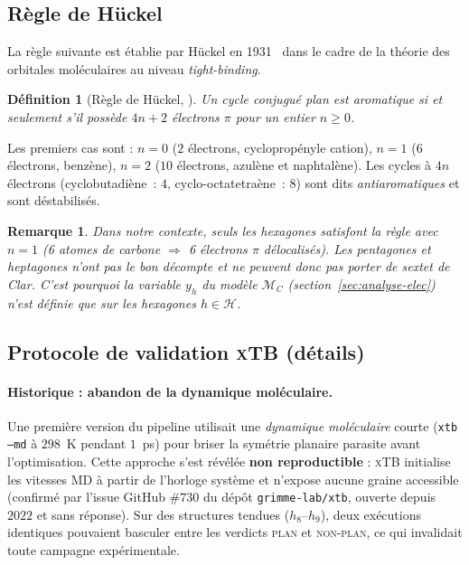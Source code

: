 \documentclass[11pt,a4paper]{article}
\newcommand{\xtb}{\textsc{xTB}}
\newtheorem{definition}{Définition}
\newtheorem{remarque}{Remarque}
\begin{document}
\subsection{Règle de Hückel}
\label{app:huckel}

La règle suivante est établie par Hückel en 1931~\cite{huckel1931} dans le
cadre de la théorie des orbitales moléculaires au niveau \emph{tight-binding}.

\begin{definition}[Règle de Hückel, \cite{huckel1931}]
Un cycle conjugué plan est \emph{aromatique} si et seulement s'il
possède $4n + 2$ électrons $\pi$ pour un entier $n \ge 0$.
\end{definition}

Les premiers cas sont : $n = 0$ ($2$ électrons, cyclopropényle cation),
$n = 1$ ($6$ électrons, benzène), $n = 2$ ($10$ électrons, azulène et
naphtalène). Les cycles à $4n$ électrons (cyclobutadiène~: $4$, cyclo-octatetraène~:
$8$) sont dits \emph{antiaromatiques} et sont déstabilisés.

\begin{remarque}
Dans notre contexte, seuls les hexagones satisfont la règle avec $n = 1$
(6 atomes de carbone $\Rightarrow$ 6 électrons $\pi$ délocalisés). Les
pentagones et heptagones n'ont pas le bon décompte et ne peuvent donc
pas porter de sextet de Clar. C'est pourquoi la variable $y_h$ du
modèle $\mathcal{M}_C$ (section~\ref{sec:analyse-elec}) n'est définie
que sur les hexagones $h \in \mathcal{H}$.
\end{remarque}

\subsection{Protocole de validation \xtb{} (détails)}
\label{app:detopt}

\paragraph{Historique : abandon de la dynamique moléculaire.}
Une première version du pipeline utilisait une \emph{dynamique
moléculaire} courte (\texttt{xtb --md} à $298$~K pendant $1$~ps) pour
briser la symétrie planaire parasite avant l'optimisation. Cette
approche s'est révélée \textbf{non reproductible} : \xtb{} initialise
les vitesses MD à partir de l'horloge système et n'expose aucune graine
accessible (confirmé par l'issue GitHub \#$730$ du dépôt
\texttt{grimme-lab/xtb}, ouverte depuis $2022$ et sans réponse). Sur
des structures tendues ($h_8$--$h_9$), deux exécutions identiques
pouvaient basculer entre les verdicts \textsc{plan} et
\textsc{non-plan}, ce qui invalidait toute campagne expérimentale.
\end{document}
